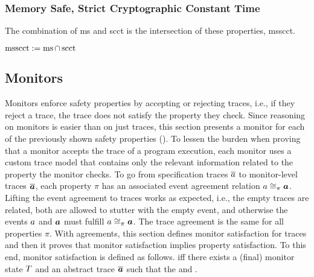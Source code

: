 \documentclass[dvipsnames]{llncs}
\begin{document}
\subsubsection{Memory Safe, Strict Cryptographic Constant Time}

The combination of \gls*{ms} and \gls*{scct} is the intersection of these properties, \gls*{msscct}.

\begin{definition}\label{def:trace:msscctdef}
  $
  \msscctsafe:=\mssafe\cap\scctsafe
  $
\end{definition}

\subsection{Monitors}\label{subsec:monitors}

Monitors enforce safety properties by accepting or rejecting traces, i.e., if they reject a trace, the trace does not satisfy the property they check.
Since reasoning on monitors is easier than on just traces, this section presents a monitor for each of the previously shown safety properties ().
To lessen the burden when proving that a monitor accepts the trace of a program execution, each monitor uses a custom trace model that contains only the relevant information related to the property the monitor checks.
To go from specification traces $\trace$ to monitor-level traces $\abstrace$, each property $\pi$ has an associated event agreement relation $\traceagree[]{\pi}{\event}{\absevent}$.
Lifting the event agreement to traces works as expected, i.e., the empty traces are related, both are allowed to stutter with the empty event, and otherwise the events $\event$ and $\absevent$ must fulfill $\traceagree[]{\pi}{\event}{\absevent}$.
The trace agreement is the same for all properties $\pi$. 
With agreements, this section defines monitor satisfaction for traces and then it proves that monitor satisfaction implies property satisfaction.
To this end, monitor satisfaction is defined as follows.
 iff there exists a (final) monitor state $\monitor$ and an abstract trace $\abstrace$ such that the  and .
\end{document}
